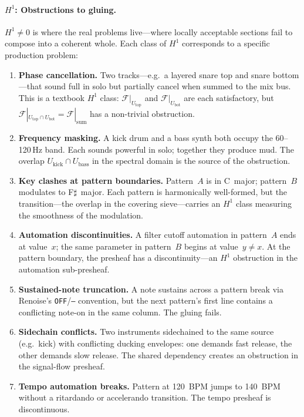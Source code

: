 \paragraph{$H^1$: Obstructions to gluing.}
$H^1 \neq 0$ is where the real problems live---where locally
acceptable sections fail to compose into a coherent whole.  Each
class of $H^1$ corresponds to a specific production problem:

\begin{enumerate}
  \item \textbf{Phase cancellation.}\;
        Two tracks---e.g.\ a layered snare top and snare
        bottom---that sound full in solo but partially cancel when
        summed to the mix bus.  This is a textbook $H^1$ class:
        $\mathcal{F}|_{U_{\mathrm{top}}}$ and
        $\mathcal{F}|_{U_{\mathrm{bot}}}$ are each satisfactory,
        but $\mathcal{F}|_{U_{\mathrm{top}} \cap
        U_{\mathrm{bot}}} = \mathcal{F}|_{\mathrm{sum}}$ has a
        non-trivial obstruction.
  \item \textbf{Frequency masking.}\;
        A kick drum and a bass synth both occupy the
        60--120\,Hz band.  Each sounds powerful in solo; together
        they produce mud.  The overlap
        $U_{\mathrm{kick}} \cap U_{\mathrm{bass}}$ in the
        spectral domain is the source of the obstruction.
  \item \textbf{Key clashes at pattern boundaries.}\;
        Pattern~$A$ is in C~major; pattern~$B$ modulates to
        F$\sharp$~major.  Each pattern is harmonically
        well-formed, but the transition---the overlap in the
        covering sieve---carries an $H^1$ class measuring the
        smoothness of the modulation.
  \item \textbf{Automation discontinuities.}\;
        A filter cutoff automation in pattern~$A$ ends at
        value~$x$; the same parameter in pattern~$B$ begins at
        value~$y \neq x$.  At the pattern boundary, the
        presheaf has a discontinuity---an $H^1$ obstruction in
        the automation sub-presheaf.
  \item \textbf{Sustained-note truncation.}\;
        A note sustains across a pattern break via Renoise's
        \texttt{OFF}/\texttt{---} convention, but the next
        pattern's first line contains a conflicting note-on in
        the same column.  The gluing fails.
  \item \textbf{Sidechain conflicts.}\;
        Two instruments sidechained to the same source
        (e.g.\ kick) with conflicting ducking envelopes: one
        demands fast release, the other demands slow release.
        The shared dependency creates an obstruction in the
        signal-flow presheaf.
  \item \textbf{Tempo automation breaks.}\;
        Pattern at 120~BPM jumps to 140~BPM without a
        ritardando or accelerando transition.  The tempo
        presheaf is discontinuous.
\end{enumerate}

